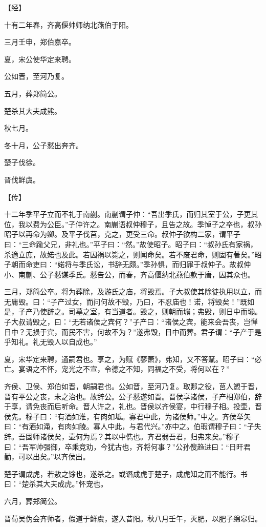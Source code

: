 \documentclass[a4paper,12pt,UTF8,twoside]{ctexbook}
\begin{document}
【经】

十有二年春，齐高偃帅师纳北燕伯于阳。

三月壬申，郑伯嘉卒。

夏，宋公使华定来聘。

公如晋，至河乃复。

五月，葬郑简公。

楚杀其大夫成熊。

秋七月。

冬十月，公子慭出奔齐。

楚子伐徐。

晋伐鲜虞。

【传】

十二年季平子立而不礼于南蒯。南蒯谓子仲：“吾出季氏，而归其室于公，子更其位，我以费为公臣。”子仲许之。南蒯语叔仲穆子，且告之故。季悼子之卒也，叔孙昭子以再命为卿。及平子伐莒，克之，更受三命。叔仲子欲构二家，谓平子曰：“三命踰父兄，非礼也。”平子曰：“然。”故使昭子。昭子曰：“叔孙氏有家祸，杀適立庶，故婼也及此。若因祸以毙之，则闻命矣。若不废君命，则固有著矣。”昭子朝而命吏曰：“婼将与季氏讼，书辞无颇。”季孙惧，而归罪于叔仲子。故叔仲小、南蒯、公子慭谋季氏。慭告公，而春，齐高偃纳北燕伯款于唐，因其众也。

三月，郑简公卒。将为葬除，及游氏之庙，将毁焉。子大叔使其除徒执用以立，而无庸毁。曰：“子产过女，而问何故不毁，乃曰，不忍庙也！诺，将毁矣！”既如是，子产乃使辟之。司墓之室，有当道者。毁之，则朝而塴；弗毁，则日中而塴。子大叔请毁之，曰：“无若诸侯之宾何？”子产曰：“诸侯之宾，能来会吾丧，岂惮日中？无损于宾，而民不害，何故不为？”遂弗毁，日中而葬。君子谓：“子产于是乎知礼。礼无毁人以自成也。”

夏，宋华定来聘，通嗣君也。享之，为赋《蓼萧》，弗知，又不答赋。昭子曰：“必亡。宴语之不怀，宠光之不宣，令德之不知，同福之不受，将何以在？”

齐侯、卫侯、郑伯如晋，朝嗣君也。公如晋，至河乃复。取郠之役，莒人愬于晋，晋有平公之丧，未之治也。故辞公。公子慭遂如晋。晋侯享诸侯，子产相郑伯，辞于享，请免丧而后听命。晋人许之，礼也。晋侯以齐侯宴，中行穆子相。投壶，晋侯先。穆子曰：“有酒如淮，有肉如坻。寡君中此，为诸侯师。”中之。齐侯举矢曰：“有酒如渑，有肉如陵。寡人中此，与君代兴。”亦中之。伯瑕谓穆子曰：“子失辞。吾固师诸侯矣，壶何为焉？其以中儁也。齐君弱吾君，归弗来矣。”穆子曰：“吾军帅强御，卒乘竞劝，今犹古也，齐将何事？”公孙傁趋进曰：“日旰君勤，可以出矣。”以齐侯出。

楚子谓成虎，若敖之馀也，遂杀之。或谮成虎于楚子，成虎知之而不能行。书曰：“楚杀其大夫成虎。”怀宠也。

六月，葬郑简公。

晋荀吴伪会齐师者，假道于鲜虞，遂入昔阳。秋八月壬午，灭肥，以肥子绵皋归。
\end{document}
